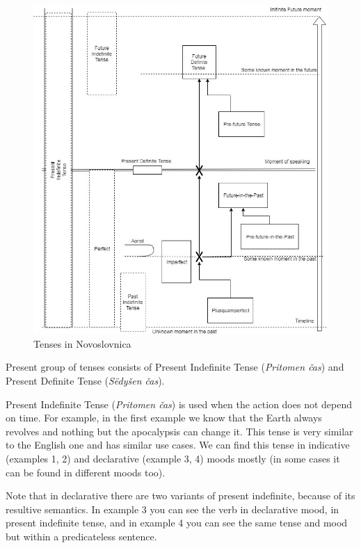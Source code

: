 \begin{figure}
	\includegraphics[width=\linewidth]{./sources/tenses.jpg}
	\caption{Tenses in Novoslovnica}
	\label{fig:tenses}
\end{figure}

Present group of tenses consists of Present Indefinite Tense (\textit{Pritomen čas}) and Present Definite Tense (\textit{Sëdyšen čas}).

Present Indefinite Tense (\textit{Pritomen čas}) is used when the action does not depend on time. For example, in the first example we know that the Earth always revolves and nothing but the apocalypsis can change it. This tense is very similar to the English one and has similar use cases. We can find this tense in indicative (examples 1, 2) and declarative (example 3, 4) moods mostly (in some cases it can be found in different moods too).

Note that in declarative there are two variants of present indefinite, because of its resultive semantics. In example 3 you can see the verb in declarative mood, in present indefinite tense, and in example 4 you can see the same tense and mood but within a predicateless sentence.

